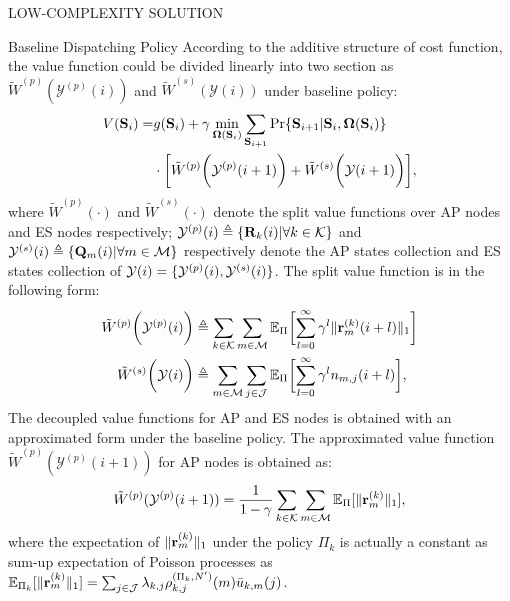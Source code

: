 \documentclass[10pt, conference, letterpaper]{IEEEtran}
\newcommand{\mat}{\mathbf}
\newcommand{\define}{\triangleq}
\renewcommand{\vec}{\mathbf}
\DeclarePairedDelimiter{\set}{\{}{\}}
\DeclarePairedDelimiter{\Inorm}{\|}{\|_1}
\DeclarePairedDelimiter{\Paren}{\bigg(}{\bigg)}
\DeclarePairedDelimiter{\Bracket}{\bigg[}{\bigg]}
\newcommand{\apSet}{\mathcal{K}}
\newcommand{\esSet}{\mathcal{M}}
\newcommand{\jSpace}{\mathcal{J}}
\newcommand{\Stat}{\mathbf{S}}
\newcommand{\Obsv}{\mathcal{Y}}
\newcommand{\Policy}{\boldsymbol{\Omega}}
\newcommand{\BPolicy}{\Policy} %
\begin{document}
\begin{section}{LOW-COMPLEXITY SOLUTION}
\begin{subsection}{Baseline Dispatching Policy}
            According to the additive structure of cost function, the value function could be divided linearly into two section as $\tilde{W}^{(p)}(\Obsv^{(p)}(i))$ and $\tilde{W}^{(s)}(\Obsv(i))$ under baseline policy:
            \begin{align}
                V(\Stat_{i}) =& 
                    g(\Stat_{i}) + \gamma \min_{\BPolicy(\Stat_{i})} \sum_{\Stat_{i+1}} \Pr\{ \Stat_{i+1}|\Stat_{i}, \BPolicy(\Stat_{i}) \}
                    \nonumber\\
                    & \cdot \Bracket{ \tilde{W}^{(p)}\Paren{\Obsv^{(p)}(i+1)} + \tilde{W}^{(s)}\Paren{\Obsv(i+1)} },
            \end{align}
            where $\tilde{W}^{(p)}(\cdot)$ and $\tilde{W}^{(s)}(\cdot)$ denote the split value functions over AP nodes and ES nodes respectively; $\Obsv^{(p)}(i) \define \set{\mat{R}_k(i)|\forall k\in\apSet}$ and $\Obsv^{(s)}(i) \define \set{\vec{Q}_m(i)|\forall m\in\esSet}$ respectively denote the AP states collection and ES states collection of $\Obsv(i) = \set{\Obsv^{(p)}(i), \Obsv^{(s)}(i)}$. The split value function is in the following form:
            \begin{align}
                \tilde{W}^{(p)}\Paren{\Obsv^{(p)}(i)} &\define \sum_{k\in\apSet}\sum_{m\in\esSet}
                    \mathbb{E}_{\Pi}\Bracket{
                        \sum_{l=0}^{\infty} \gamma^{l} \Inorm{\vec{r}^{(k)}_{m}(i+l)}
                    }
                \\
                \tilde{W}^{(s)}\Paren{\Obsv(i)} &\define \sum_{m\in\esSet}\sum_{j\in\jSpace}
                    \mathbb{E}_{\Pi}\Bracket{
                        \sum_{l=0}^{\infty} \gamma^{l} n_{m,j}(i+l)
                    },
            \end{align}
            The decoupled value functions for AP and ES nodes is obtained with an approximated form under the baseline policy.
            The approximated value function $\tilde{W}^{(p)}(\Obsv^{(p)}(i+1))$ for AP nodes is obtained as:
            \begin{align}
                \tilde{W}^{(p)}(\Obsv^{(p)}(i+1)) = \frac{1}{1-\gamma}
                    \sum_{k\in\apSet}\sum_{m\in\esSet} \mathbb{E}_{\Pi}[\Inorm{\vec{r}^{(k)}_{m}}],
            \end{align}
            where the expectation of $\Inorm{\vec{r}^{(k)}_{m}}$ under the policy $\Pi_k$ is actually a constant as sum-up expectation of Poisson processes as $\mathbb{E}_{\Pi_k}[\Inorm{\vec{r}^{(k)}_{m}}] = \sum_{j\in\jSpace} \lambda_{k,j} \rho^{(\Pi_k,N')}_{k,j}(m) \bar{u}_{k,m}(j)$.
            

\end{subsection}
\end{section}
\end{document}
